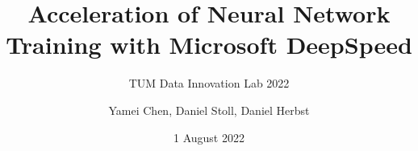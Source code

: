 \documentclass[12pt, aspectratio=169]{beamer}
\title{Acceleration of Neural Network Training with Microsoft DeepSpeed}
\subtitle{TUM Data Innovation Lab 2022}
\author{Yamei Chen, Daniel Stoll, Daniel Herbst}
\date{1 August 2022}
\begin{document}
	
	\begin{frame}[plain]
		\maketitle
	\end{frame}

	\begin{frame}
		\tableofcontents
	\end{frame}

	
	
	
	
\end{document}

